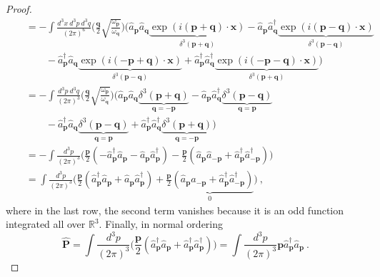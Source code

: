 \begin{proof}
\begin{equation*}
\begin{aligned}
            \phantom{\hat{\mathbf P}} & = - \int \frac{d^3 x ~ d^3 p ~ d^3 q}{{(2\pi)}^6} \Big (\frac{\mathbf q}{2} \sqrt{\frac{\omega_{\mathbf p}}{\omega_{\mathbf q}}} \Big ) (\hat a_{\mathbf p} \hat a_{\mathbf q} \underbrace{\exp(i (\mathbf p + \mathbf q) \cdot \mathbf x)}_{\delta^3 (\mathbf p + \mathbf q)} - \hat a_{\mathbf p} \hat a_{\mathbf q}^\dagger \underbrace{\exp(i (\mathbf p - \mathbf q) \cdot \mathbf x)}_{\delta^3 (\mathbf p - \mathbf q)} \\ & \qquad - \hat a_{\mathbf p}^\dagger \hat a_{\mathbf q} \underbrace{\exp(i (-\mathbf p + \mathbf q) \cdot \mathbf x)}_{\delta^3 (\mathbf p - \mathbf q)} + \hat a_{\mathbf p}^\dagger \hat a_{\mathbf q}^\dagger \underbrace{\exp(i (-\mathbf p - \mathbf q) \cdot \mathbf x)}_{\delta^3 (\mathbf p + \mathbf q)} ) \\ & = - \int \frac{d^3 p ~ d^3 q}{{(2\pi)}^3} \Big (\frac{\mathbf q}{2} \sqrt{\frac{\omega_{\mathbf p}}{\omega_{\mathbf q}}} \Big ) (\hat a_{\mathbf p} \hat a_{\mathbf q} \underbrace{\delta^3 (\mathbf p + \mathbf q) }_{\mathbf q = - \mathbf p} - \hat a_{\mathbf p} \hat a_{\mathbf q}^\dagger \underbrace{\delta^3 (\mathbf p - \mathbf q) }_{\mathbf q = \mathbf p} \\ & \qquad - \hat a_{\mathbf p}^\dagger \hat a_{\mathbf q} \underbrace{\delta^3 (\mathbf p - \mathbf q) }_{\mathbf q = \mathbf p} + \hat a_{\mathbf p}^\dagger \hat a_{\mathbf q}^\dagger \underbrace{\delta^3 (\mathbf p + \mathbf q) }_{\mathbf q = - \mathbf p}) \\ & = - \int \frac{d^3 p}{{(2\pi)}^3} \Big (\frac{\mathbf p}{2} (- \hat a_{\mathbf p}^\dagger \hat a_{\mathbf p} - \hat a_{\mathbf p} \hat a_{\mathbf p}^\dagger) - \frac{\mathbf p}{2} (\hat a_{\mathbf p} \hat a_{- \mathbf p} + \hat a_{\mathbf p}^\dagger \hat a_{- \mathbf p}^\dagger) \Big) \\ & = \int \frac{d^3 p}{{(2\pi)}^3} \Big (\frac{\mathbf p}{2} (\hat a_{\mathbf p}^\dagger \hat a_{\mathbf p} + \hat a_{\mathbf p} \hat a_{\mathbf p}^\dagger) + \underbrace{\frac{\mathbf p}{2} (\hat a_{\mathbf p} \hat a_{- \mathbf p} + \hat a_{\mathbf p}^\dagger \hat a_{- \mathbf p}^\dagger)}_{0} \Big)  ~,
        \end{aligned}
        \end{equation*}
        where in the last row, the second term vanishes because it is an odd function integrated all over $\mathbb R^3$. Finally, in normal ordering  
        \begin{equation*}
            \hat{\mathbf P} = \int \frac{d^3 p}{{(2\pi)}^3} \Big (\frac{\mathbf p}{2} (\hat a_{\mathbf p}^\dagger \hat a_{\mathbf p} + \hat a_{\mathbf p}^\dagger \hat a_{\mathbf p}^\dagger) \Big) = \int \frac{d^3 p}{{(2\pi)}^3} \mathbf p \hat a_{\mathbf p}^\dagger \hat a_{\mathbf p} ~.
        \end{equation*}
    \end{proof}

